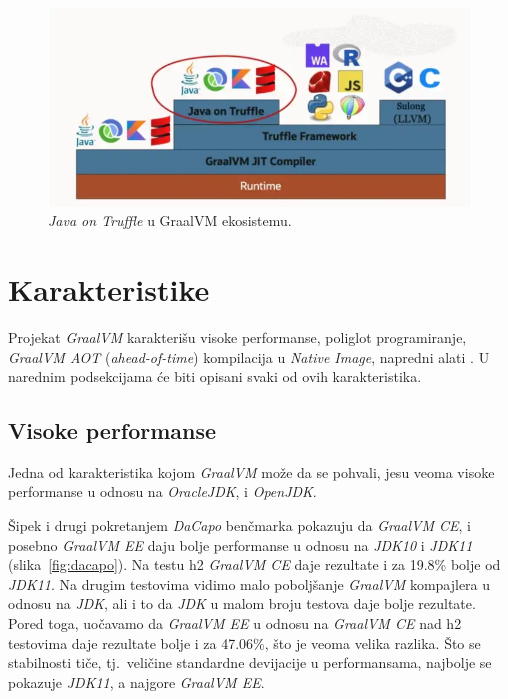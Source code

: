 \documentclass[a4paper]{article}
\begin{document}
\begin{figure}
	\begin{center}
	\includegraphics[scale=0.35]{imgs/java_on_truffle.png}
	\end{center}
	\caption{\emph{Java on Truffle} u GraalVM ekosistemu.}
	\label{fig:javaontruffle}
\end{figure}

\section{Karakteristike}
\label{sec:karakteristike}

Projekat \emph{GraalVM} karakterišu visoke performanse, poliglot programiranje, \emph{GraalVM AOT} (\emph{ahead-of-time}) kompilacija u \emph{Native Image}, napredni alati \cite{graalvm}. U narednim podsekcijama će biti opisani svaki od ovih karakteristika.

\subsection{Visoke performanse}
\label{sub:perf}

Jedna od karakteristika kojom \emph{GraalVM} može da se pohvali, jesu veoma visoke performanse u odnosu na \emph{OracleJDK}, i \emph{OpenJDK}. 

Šipek i drugi \cite{vsipek19} pokretanjem \emph{DaCapo} benčmarka \cite{dacapo} pokazuju da \emph{GraalVM CE}, i posebno \emph{GraalVM EE} daju bolje performanse u odnosu na \emph{JDK10} i \emph{JDK11} (slika~\ref{fig:dacapo}). Na testu h2 \emph{GraalVM CE} daje rezultate i za 19.8\% bolje od \emph{JDK11}. Na drugim testovima vidimo malo poboljšanje \emph{GraalVM} kompajlera u odnosu na \emph{JDK}, ali i to da \emph{JDK} u malom broju testova daje bolje rezultate. Pored toga, uočavamo da \emph{GraalVM EE} u odnosu na \emph{GraalVM CE} nad h2 testovima daje rezultate bolje i za 47.06\%, što je veoma velika razlika. Što se stabilnosti tiče, tj.\ veličine standardne devijacije u performansama, najbolje se pokazuje \emph{JDK11}, a najgore \emph{GraalVM EE}.
\end{document}
